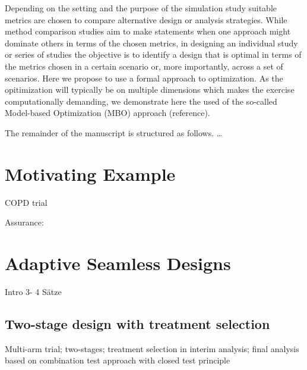 \documentclass[bimj,fleqn]{w-art}
\theoremstyle{plain}
\theoremstyle{definition}
\begin{document}
Depending on the setting and the purpose of the simulation study suitable metrics are chosen to compare alternative design or analysis strategies. 
While method comparison studies aim to make statements when one approach might dominate others in terms of the chosen metrics, in designing an individual study or series of studies the objective is to identify a design that is optimal in terms of the metrics chosen in a certain scenario or, more importantly, across a set of scenarios. 
Here we propose to use a formal approach to optimization. As the opitimization will typically be on multiple dimensions which makes the exercise computationally demanding, we demonstrate here the used of the so-called Model-based Optimization (MBO) approach (reference).

The remainder of the manuscript is structured as follows. \dots 



\section{Motivating Example}
COPD trial
\cite{friede_adaptive_2020}

\cite{barnes_integrating_2010}
\cite{donohue_oncedaily_2010}
\cite{cuffe_when_2014}

Assurance: \cite{stallard_optimal_2009}

\section{Adaptive Seamless Designs}
Intro 3- 4 Sätze

\subsection{Two-stage design with treatment selection}
Multi-arm trial; two-stages; treatment selection in interim analysis; final analysis based on combination test approach with closed test principle

\end{document}
